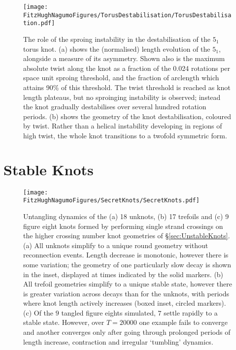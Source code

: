 \begin{figure}[htbp]
\centering
    \texttt{[image: \\FitzHughNagumoFigures/TorusDestabilisation/TorusDestabilisation.pdf]}
    \caption[The role of the sproing instability in knot destabilisation.]{ The role of the sproing instability in the destabilisation of the $5_1$ torus knot. (a) shows the (normalised) length evolution of the $5_1$, alongside a measure of its asymmetry. Shown also is the maximum absolute twist along the knot as a fraction of the 0.024 rotations per space unit sproing threshold, and the fraction of arclength which attains 90\% of this threshold. The twist threshold is reached as knot length plateaus, but no sproinging instability is observed; instead the knot gradually destabilises over several hundred rotation periods. (b) shows the geometry of the knot destabilisation, coloured by twist. Rather than a helical instability developing in regions of high twist, the whole knot transitions to a twofold symmetric form.}
\label{fig:TorusDestabilisation}
\end{figure}

\section{\label{sec:StableKnots}Stable Knots}
\begin{figure}[htbp]
    \texttt{[image: \\FitzHughNagumoFigures/SecretKnots/SecretKnots.pdf]}
    \caption[Untangling dynamics.]{ Untangling dynamics of the (a) 18 unknots, (b) 17 trefoils and (c) 9 figure eight knots formed by performing single strand crossings on the higher crossing number knot geometries of \S \ref{sec:UnstableKnots}. (a) All unknots simplify to a unique round geometry without reconnection events. Length decrease is monotonic, however there is some variation; the geometry of one particularly slow decay is shown in the inset, displayed at times indicated by the solid markers. (b) All trefoil geometries simplify to a unique stable state, however there is greater variation across decays than for the unknots, with periods where knot length actively increases (boxed inset, circled markers). (c) Of the $9$ tangled figure eights simulated, $7$ settle rapidly to a stable state. However, over $T=20000$ one example fails to converge and another converges only after going through prolonged periods of length increase, contraction and irregular `tumbling' dynamics.} 
\label{fig:SecretFourOneLength}
\end{figure}

